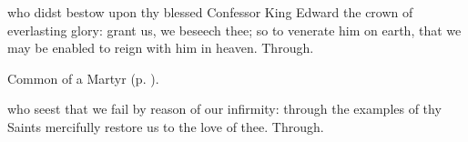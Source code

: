 
\memorialCollect
{} who didst bestow upon thy blessed Confessor King Edward the crown of everlasting glory: grant us, we beseech thee; so to venerate him on earth, that we may be enabled to reign with him in heaven. Through.


\clearpage
{}

\begin{rubric}
	Common of a Martyr (p. \pageref{CommonMartyr}).
\end{rubric}

{} who seest that we fail by reason of our infirmity: through the examples of thy Saints mercifully restore us to the love of thee. Through.





